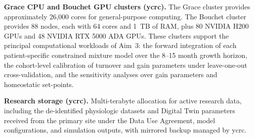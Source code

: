\documentclass[11pt]{article}
\begin{document}
\textbf{Grace CPU and Bouchet GPU clusters (\gls*{ycrc}).} The Grace cluster provides approximately 26,000 cores for general-purpose computing. The Bouchet cluster provides 88 nodes, each with 64 cores and 1~TB of RAM, plus 80 NVIDIA H200 GPUs and 48 NVIDIA RTX 5000 ADA GPUs. These clusters support the principal computational workloads of Aim~3: the forward integration of each patient-specific constrained mixture model over the 8--15 month growth horizon, the cohort-level calibration of turnover and gain parameters under leave-one-out cross-validation, and the sensitivity analyses over gain parameters and homeostatic set-points.

\textbf{Research storage (\gls*{ycrc}).} Multi-terabyte allocation for active research data, including the de-identified physiologic datasets and Digital Twin parameters received from the primary site under the Data Use Agreement, model configurations, and simulation outputs, with mirrored backup managed by \gls*{ycrc}.
\end{document}
